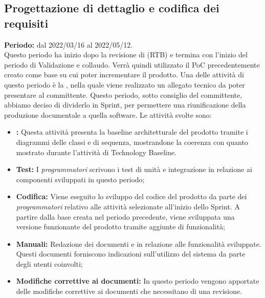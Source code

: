 
\subsection{Progettazione di dettaglio e codifica dei requisiti} \label{subsection:pianificazione_requisiti_obbligatori}
\textbf{Periodo:} dal 2022/03/16 al 2022/05/12.
\bigskip
\\Questo periodo ha inizio dopo la revisione di \RTB{} (RTB\glo{}) e termina con l'inizio del periodo di Validazione e collaudo.
Verrà quindi utilizzato il PoC\glo{} precedentemente creato come base su cui poter incrementare il prodotto.
Una delle attività di questo periodo è la \PB{}, nella quale viene realizzato un allegato tecnico da poter presentare al committente.
Questo periodo, sotto consiglio del committente, abbiamo deciso di dividerlo in Sprint\glo{}, per permettere una riunificazione della produzione documentale a quella software.
Le attività svolte sono:
\begin{itemize}
  \item \textbf{\PB{}:} Questa attività presenta la baseline architetturale del prodotto tramite i diagrammi delle classi e di sequenza, mostrandone la coerenza con quanto mostrato durante l'attività di Technology Baseline.
  \item \textbf{Test:} I \textit{programmatori} scrivono i test di unità e integrazione in relazione ai componenti sviluppati in questo periodo;
  \item \textbf{Codifica:} Viene eseguito lo sviluppo del codice del prodotto da parte dei \textit{programmatori} relativo alle attività selezionate all'inizio dello Sprint\glo{}.
        A partire dalla base creata nel periodo precedente, viene sviluppata una versione funzionante del prodotto tramite aggiunte di funzionalità;
  \item \textbf{Manuali:} Redazione dei documenti \docNameVersionMU{} e \docNameVersionMS{} in relazione alle funzionalità sviluppate.
        Questi documenti forniscono indicazioni sull'utilizzo del sistema da parte degli utenti coinvolti;
  \item \textbf{Modifiche correttive ai documenti:} In questo periodo vengono apportate delle modifiche correttive ai documenti che necessitano di una revisione.
\end{itemize}


